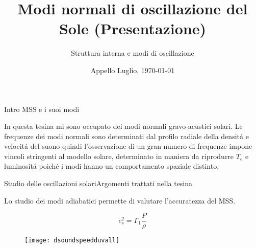 \documentclass[10pt,xcolor={usenames},fleqn,mathserif,serif]{beamer}
\title{Modi normali di oscillazione del Sole (Presentazione)}
\subtitle{Struttura interna e modi di oscillazione}
\date{Appello Luglio, \today}
\begin{document}


\begin{frame}
  \titlepage
\end{frame}

\begin{wordonframe}{Intro MSS e i suoi modi}

In questa tesina mi sono occupato dei modi normali gravo-acustici solari. Le frequenze dei modi normali sono determinati dal profilo radiale della densit\'a e velocit\'a del suono quindi l'osservazione di un gran numero di frequenze impone vincoli stringenti al modello solare, determinato in maniera da riprodurre $T_e$ e luminosit\'a poich\'e i modi hanno un comportamento spaziale distinto.

\end{wordonframe}



\begin{frame}[label={intro}]{Studio delle oscillazioni solari}{Argomenti trattati nella tesina}

Lo studio dei modi adiabatici permette di valutare l'accuratezza del MSS.

\begin{equation*}
c_s^2=\Gamma_1\frac{P}{\rho}
\end{equation*}

\begin{figure}[!ht]
\texttt{[image: dsoundspeedduvall]} 

\label{dsoundduvall}
\end{figure}

\end{frame}
\end{document}
